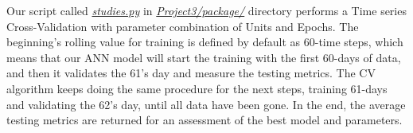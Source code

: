 Our script called \href{https://github.com/fabiorodp/UiO-FYS-STK4155/tree/master/Project3/package/studies.py}{\textit{studies.py}} in \href{https://github.com/fabiorodp/UiO-FYS-STK4155/tree/master/Project3/package/}{\textit{Project3/package/}} directory performs a Time series Cross-Validation with parameter combination of Units and Epochs. The beginning's rolling value for training is defined by default as 60-time steps, which means that our ANN model will start the training with the first 60-days of data, and then it validates the 61's day and measure the testing metrics. The CV algorithm keeps doing the same procedure for the next steps, training 61-days and validating the 62's day, until all data have been gone. In the end, the average testing metrics are returned for an assessment of the best model and parameters.